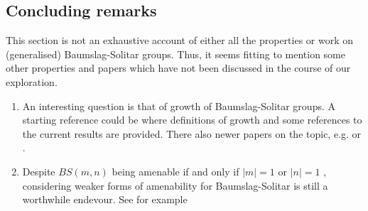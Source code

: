 \subsection{Concluding remarks}
This section is not an exhaustive account of either all the properties or work on (generalised) Baumslag-Solitar groups. Thus, it seems fitting to mention some other properties and papers which have not been discussed in the course of our exploration.
\begin{enumerate}
    \item An interesting question is that of growth of Baumslag-Solitar groups. A starting reference could be \cite{Ha00} where definitions of growth and some references to the current results are provided. There also newer papers on the topic, e.g. \cite{SaSh18} or \cite{FrKnSch11}.
    \item Despite $BS(m,n)$ being amenable if and only if $|m| = 1$ or $|n| = 1$ \cite{CaGaMaSt24}, considering weaker forms of amenability for Baumslag-Solitar is still a worthwhile endevour. See for example 
\end{enumerate}




